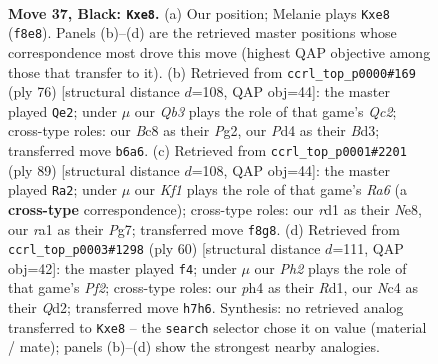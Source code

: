 \documentclass[11pt]{article}
\begin{document}
\clearpage

\begin{figure}[p]\centering
\begin{subfigure}{0.46\textwidth}\centering
\resizebox{\linewidth}{!}{%
\newchessgame
\chessboard[
  setfen={r1b1Bk2/3p2bp/1q2p3/p4pB1/P1np3P/5NQ1/1P3PK1/RN1R4 b - - 0 37},
  showmover=false,
  pgfstyle=straightmove, color=movearrow, markmove={f8-e8}
]}
\caption{}
\end{subfigure}\hfill
\begin{subfigure}{0.46\textwidth}\centering
\resizebox{\linewidth}{!}{%
\newchessgame
\chessboard[
  setfen={1r2n1k1/2qb1pp1/2pp3p/8/1P2PP1b/3BB1NP/2Q3PK/1R6 w - - 0 39},
  showmover=false,
  pgfstyle=straightmove, color=movearrow, markmove={c2-e2}
]}
\caption{}
\end{subfigure}
\\[4pt]
\begin{subfigure}{0.46\textwidth}\centering
\resizebox{\linewidth}{!}{%
\newchessgame
\chessboard[
  setfen={4nbk1/3b2p1/5p1p/q1pPp3/2P1P3/r3B1NP/4BQPK/3R4 b - - 7 45},
  showmover=false,
  pgfstyle=straightmove, color=movearrow, markmove={a3-a2}
]}
\caption{}
\end{subfigure}\hfill
\begin{subfigure}{0.46\textwidth}\centering
\resizebox{\linewidth}{!}{%
\newchessgame
\chessboard[
  setfen={4r3/r3q1bk/pNpp2p1/4nb1p/2PB4/R6P/P2Q1PP1/3R1BK1 w - - 8 31},
  showmover=false,
  pgfstyle=straightmove, color=movearrow, markmove={f2-f4}
]}
\caption{}
\end{subfigure}
\caption{\textbf{Move 37, Black: \texttt{Kxe8}.} (a) Our position; Melanie plays \texttt{Kxe8} (\texttt{f8e8}). Panels (b)--(d) are the retrieved master positions whose correspondence most drove this move (highest QAP objective among those that transfer to it). (b) Retrieved from \texttt{ccrl\_top\_p0000\#169} (ply 76) [structural distance $d$=108, QAP obj=44]: the master played \texttt{Qe2}; under $\mu$ our \emph{Qb3} plays the role of that game's \emph{Qc2}; cross-type roles: our \emph{B}c8 as their \emph{P}g2, our \emph{P}d4 as their \emph{B}d3; transferred move \texttt{b6a6}. (c) Retrieved from \texttt{ccrl\_top\_p0001\#2201} (ply 89) [structural distance $d$=108, QAP obj=44]: the master played \texttt{Ra2}; under $\mu$ our \emph{Kf1} plays the role of that game's \emph{Ra6} (a \textbf{cross-type} correspondence); cross-type roles: our \emph{r}d1 as their \emph{N}e8, our \emph{r}a1 as their \emph{P}g7; transferred move \texttt{f8g8}. (d) Retrieved from \texttt{ccrl\_top\_p0003\#1298} (ply 60) [structural distance $d$=111, QAP obj=42]: the master played \texttt{f4}; under $\mu$ our \emph{Ph2} plays the role of that game's \emph{Pf2}; cross-type roles: our \emph{p}h4 as their \emph{R}d1, our \emph{N}c4 as their \emph{Q}d2; transferred move \texttt{h7h6}. Synthesis: no retrieved analog transferred to \texttt{Kxe8} -- the \texttt{search} selector chose it on value (material / mate); panels (b)--(d) show the strongest nearby analogies.}
\label{fig:thought-m73}
\end{figure}
\end{document}
